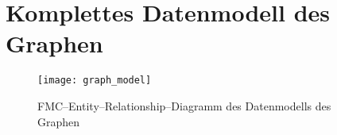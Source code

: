 \chapter{Komplettes Datenmodell des Graphen}
\label{complete_data_model}

\begin{figure}[h]
\centering
\texttt{[image: graph\_model]}
\caption{FMC--Entity--Relationship--Diagramm des Datenmodells des Graphen}
\label{fig:graph_model}
\end{figure}